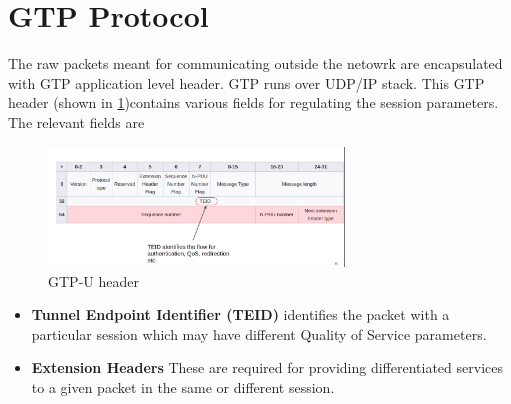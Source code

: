 \section {GTP Protocol\label{sec:GTP}}
The raw packets meant for communicating outside the netowrk are encapsulated with GTP  application level 
header. GTP runs over UDP/IP stack. This GTP header  (shown in \ref{figGTPheader})contains various fields for regulating the
 session parameters. The relevant fields are
 \begin{figure}[htbp]
    \centering
    \includegraphics[width=0.7\textwidth, keepaspectratio]{./fig/gtp.png}
    \caption{GTP-U header \cite{gtpwiki}}
    \label{figGTPheader}
\end{figure}
 \begin{itemize}
    \item \textbf{Tunnel Endpoint Identifier (TEID)} identifies the packet with a particular session which may have different Quality of Service parameters.
    \item \textbf{Extension Headers} These are required for providing differentiated services to  a given packet in the same or different session.
 \end{itemize}

